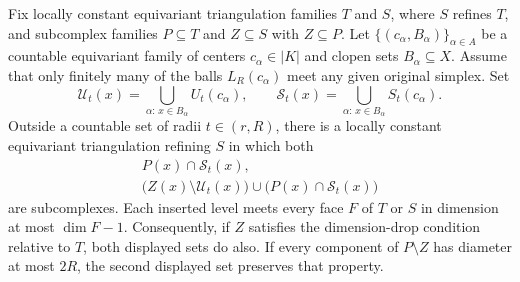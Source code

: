 \begin{lemma}\label{lem:refinement}
Fix locally constant equivariant triangulation families $T$ and $S$,
where $S$ refines $T$, and subcomplex families $P\subseteq T$ and
$Z\subseteq S$ with $Z\subseteq P$.  Let
$\{(c_\alpha,B_\alpha)\}_{\alpha\in A}$ be a countable equivariant
family of centers $c_\alpha\in|K|$ and clopen sets $B_\alpha\subseteq X$.
Assume that only finitely many of the balls $L_R(c_\alpha)$ meet any
given original simplex.  Set
\[
 \mathcal U_t(x)=\bigcup_{\alpha:\,x\in B_\alpha}U_t(c_\alpha),
 \qquad
 \mathcal S_t(x)=\bigcup_{\alpha:\,x\in B_\alpha}S_t(c_\alpha).
\]
Outside a countable set of radii $t\in(r,R)$, there is a locally
constant equivariant triangulation refining $S$ in which both
\begin{equation}\label{eq:cut-replacement}
\begin{gathered}
 P(x)\cap\mathcal S_t(x),\\
 \bigl(Z(x)\setminus\mathcal U_t(x)\bigr)
       \cup\bigl(P(x)\cap\mathcal S_t(x)\bigr)
\end{gathered}
\end{equation}
are subcomplexes.  Each inserted level meets every face $F$ of $T$ or
$S$ in dimension at most $\dim F-1$.  Consequently, if $Z$ satisfies
the dimension-drop condition relative to $T$, both displayed sets do
also.  If every component of $P\setminus Z$ has diameter at most $2R$,
the second displayed set preserves that property.
\end{lemma}

